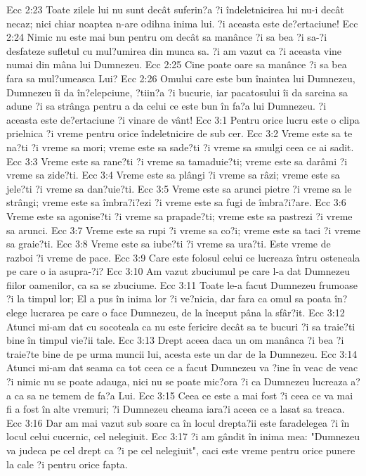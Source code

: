 Ecc 2:23  Toate zilele lui nu sunt decât suferin?a ?i îndeletnicirea lui nu-i decât necaz; nici chiar noaptea n-are odihna inima lui. ?i aceasta este de?ertaciune!
Ecc 2:24  Nimic nu este mai bun pentru om decât sa manânce ?i sa bea ?i sa-?i desfateze sufletul cu mul?umirea din munca sa. ?i am vazut ca ?i aceasta vine numai din mâna lui Dumnezeu.
Ecc 2:25  Cine poate oare sa manânce ?i sa bea fara sa mul?umeasca Lui?
Ecc 2:26  Omului care este bun înaintea lui Dumnezeu, Dumnezeu îi da în?elepciune, ?tiin?a ?i bucurie, iar pacatosului îi da sarcina sa adune ?i sa strânga pentru a da celui ce este bun în fa?a lui Dumnezeu. ?i aceasta este de?ertaciune ?i vinare de vânt!
Ecc 3:1  Pentru orice lucru este o clipa prielnica ?i vreme pentru orice îndeletnicire de sub cer.
Ecc 3:2  Vreme este sa te na?ti ?i vreme sa mori; vreme este sa sade?ti ?i vreme sa smulgi ceea ce ai sadit.
Ecc 3:3  Vreme este sa rane?ti ?i vreme sa tamaduie?ti; vreme este sa darâmi ?i vreme sa zide?ti.
Ecc 3:4  Vreme este sa plângi ?i vreme sa râzi; vreme este sa jele?ti ?i vreme sa dan?uie?ti.
Ecc 3:5  Vreme este sa arunci pietre ?i vreme sa le strângi; vreme este sa îmbra?i?ezi ?i vreme este sa fugi de îmbra?i?are.
Ecc 3:6  Vreme este sa agonise?ti ?i vreme sa prapade?ti; vreme este sa pastrezi ?i vreme sa arunci.
Ecc 3:7  Vreme este sa rupi ?i vreme sa co?i; vreme este sa taci ?i vreme sa graie?ti.
Ecc 3:8  Vreme este sa iube?ti ?i vreme sa ura?ti. Este vreme de razboi ?i vreme de pace.
Ecc 3:9  Care este folosul celui ce lucreaza întru osteneala pe care o ia asupra-?i?
Ecc 3:10  Am vazut zbuciumul pe care l-a dat Dumnezeu fiilor oamenilor, ca sa se zbuciume.
Ecc 3:11  Toate le-a facut Dumnezeu frumoase ?i la timpul lor; El a pus în inima lor ?i ve?nicia, dar fara ca omul sa poata în?elege lucrarea pe care o face Dumnezeu, de la început pâna la sfâr?it.
Ecc 3:12  Atunci mi-am dat cu socoteala ca nu este fericire decât sa te bucuri ?i sa traie?ti bine în timpul vie?ii tale.
Ecc 3:13  Drept aceea daca un om manânca ?i bea ?i traie?te bine de pe urma muncii lui, acesta este un dar de la Dumnezeu.
Ecc 3:14  Atunci mi-am dat seama ca tot ceea ce a facut Dumnezeu va ?ine în veac de veac ?i nimic nu se poate adauga, nici nu se poate mic?ora ?i ca Dumnezeu lucreaza a?a ca sa ne temem de fa?a Lui.
Ecc 3:15  Ceea ce este a mai fost ?i ceea ce va mai fi a fost în alte vremuri; ?i Dumnezeu cheama iara?i aceea ce a lasat sa treaca.
Ecc 3:16  Dar am mai vazut sub soare ca în locul drepta?ii este faradelegea ?i în locul celui cucernic, cel nelegiuit.
Ecc 3:17  ?i am gândit în inima mea: "Dumnezeu va judeca pe cel drept ca ?i pe cel nelegiuit", caci este vreme pentru orice punere la cale ?i pentru orice fapta.
